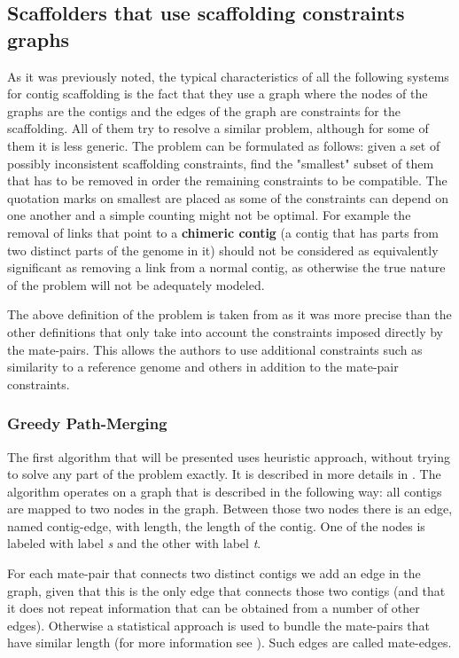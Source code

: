 \documentclass[11pt]{article}
\begin{document}
\subsection{Scaffolders that use scaffolding constraints graphs} %
\label{sub:Scaffolders that use scaffolding constraints graphs}
As it was previously noted, the typical characteristics of all the following
systems for contig scaffolding is the fact that they use a graph where the nodes
of the graphs are the contigs and the edges of the graph are constraints for the
scaffolding. All of them try to resolve a similar problem, although for some of
them it is less generic. The problem can be formulated as follows: given a set
of possibly inconsistent scaffolding constraints, find the "smallest" subset of
them that has to be removed in order the remaining constraints to be compatible.
The quotation marks on smallest are placed as some of the constraints can depend
on one another and a simple counting might not be optimal. For example the
removal of links that point to a \textbf{chimeric contig} (a contig that has
parts from two distinct parts of the genome in it) should not be considered as
equivalently significant as removing a link from a normal contig, as otherwise
the true nature of the problem will not be adequately modeled. 

The above definition of the problem is taken from \cite{grass} as it was more
precise than the other definitions that only take into account the constraints
imposed directly by the mate-pairs. This allows the authors to use additional
constraints such as similarity to a reference genome and others in addition to
the mate-pair constraints.

\subsubsection{Greedy Path-Merging} %
\label{ssub:Greedy Path-Merging}
The first algorithm that will be presented uses heuristic approach, without
trying to solve any part of the problem exactly. It is described in more details
in \cite{greedy-path-merging}. The algorithm operates on a graph that is
described in the following way: all contigs are mapped to two nodes in the
graph. Between those two nodes there is an edge, named contig-edge, with length,
the length of the contig. One of the nodes is labeled with label \emph{s} and
the other with label \emph{t}. 

For each mate-pair that connects two distinct contigs we add an edge in the
graph, given that this is the only edge that connects those two contigs (and that
it does not repeat information that can be obtained from a number of other
edges). Otherwise a statistical approach is used to bundle the mate-pairs that
have similar length (for more information see \cite{greedy-path-merging}). Such
edges are called mate-edges.
\end{document}
